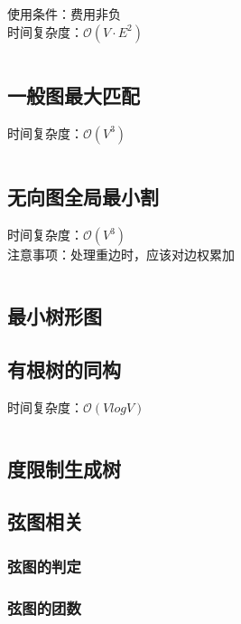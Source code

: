 \documentclass[a4paper]{article}
\newcommand{\cppcode}[1]{
    \inputminted[mathescape]{cpp}{source/#1}
}
\begin{document}
使用条件：费用非负\\
\indent 时间复杂度：$\mathcal{O}(V \cdot E^2)$

\cppcode{graph-theory/minimum-cost-flow-zkw.cpp}

\subsection{一般图最大匹配}

时间复杂度：$\mathcal{O}(V^3)$

\cppcode{graph-theory/maximum-matching-blossom.cpp}

\subsection{无向图全局最小割}

时间复杂度：$\mathcal{O}(V^3)$\\
\indent 注意事项：处理重边时，应该对边权累加

\cppcode{graph-theory/minimum-cut-stoer-wagner.cpp}

\subsection{最小树形图}

\subsection{有根树的同构}

时间复杂度：$\mathcal{O}(V log V)$

\cppcode{graph-theory/rooted-tree-isomorphism.cpp}

\subsection{度限制生成树}

\subsection{弦图相关}

\subsubsection{弦图的判定}

\subsubsection{弦图的团数}
\end{document}
